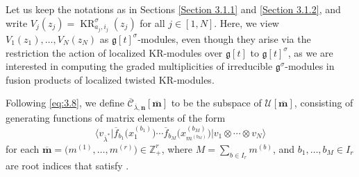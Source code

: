 \documentclass[10pt,a4paper]{amsart}
\numberwithin{equation}{section}
\DeclareMathOperator{\KR}{KR}
\begin{document}
Let us keep the notations as in Sections \ref{Section 3.1.1} and \ref{Section 3.1.2}, and write $V_j(z_j)=\KR_{a_j,i_j} ^{\sigma}(z_j)$ for all $j\in [1,N]$. Here, we view $V_1(z_1), \dots,V_N(z_N)$ as $\mathfrak{g}[t]^{\sigma}$-modules, even though they arise via the restriction the action of localized KR-modules over $\mathfrak{g}[t]$ to $\mathfrak{g}[t]^{\sigma}$, as we are interested in computing the graded multiplicities of irreducible $\mathfrak{g}^{\sigma}$-modules in fusion products of localized twisted KR-modules.

Following \eqref{eq:3.8}, we define $\overline{\mathcal{C}}_{\overline{\lambda},\mathbf{n}}[\overline{\mathbf{m}}]$ to be the subspace of $\mathcal{U}[\overline{\mathbf{m}}]$, consisting of generating functions of matrix elements of the form
\begin{equation}
\big\langle v_{\overline{\lambda}^*}\big|\overline{f}_{b_1}\bigl(x_1^{(b_1)}\bigr)\cdots\overline{f}_{b_M}\bigl(x_{m^{(b_M)}}^{(b_M)}\bigr) \big|v_1\otimes\cdots\otimes v_N\big\rangle\label{eq:3.29}
\end{equation}
for each $\overline{\mathbf{m}}=\bigl(m^{(1)},\dots,m^{(r)}\bigr)\in \mathbb{Z}_+^r$, where $M=\sum_{b\in I_r}m^{(b)}$, and $b_1,\dots,b_M\in I_r$ are root indices that satisfy .
\end{document}

